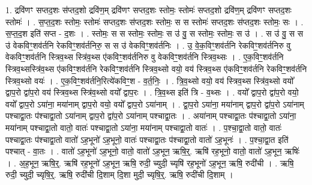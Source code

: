 \documentclass[17pt]{extarticle}
\begin{document}
1. द्रवि॑णꣳ सप्तद॒शः स॑प्तद॒शो द्रवि॑ण॒म् द्रवि॑णꣳ सप्तद॒शः स्तोमः॒ स्तोमः॑ सप्तद॒शो द्रवि॑ण॒म् द्रवि॑णꣳ सप्तद॒शः स्तोमः॑ । . स॒प्त॒द॒शः स्तोमः॒ स्तोमः॑ सप्तद॒शः स॑प्तद॒शः स्तोमः॒ स स स्तोमः॑ सप्तद॒शः स॑प्तद॒शः स्तोमः॒ सः । . स॒प्त॒द॒श इति॑ सप्त - द॒शः । . स्तोमः॒ स स स्तोमः॒ स्तोमः॒ स उ॑ वु॒ स स्तोमः॒ स्तोमः॒ स उ॑ । . स उ॑ वु॒ स स उ॑ वेकविꣳ॒॒शव॑र्तनि रेकविꣳ॒॒शव॑र्तनिरु॒ स स उ॑ वेकविꣳ॒॒शव॑र्तनिः । . उ॒ वे॒क॒विꣳ॒॒शव॑र्तनि रेकविꣳ॒॒शव॑र्तनिरु वु वेकविꣳ॒॒शव॑र्तनि स्त्रिव॒थ्स स्त्रि॑व॒थ्स ए॑कविꣳ॒॒शव॑र्तनिरु वु वेकविꣳ॒॒शव॑र्तनि स्त्रिव॒थ्सः । . ए॒क॒विꣳ॒॒शव॑र्तनि स्त्रिव॒थ्सस्त्रि॑व॒थ्स ए॑कविꣳ॒॒शव॑र्तनि रेकविꣳ॒॒शव॑र्तनि स्त्रिव॒थ्सो वयो॒ वय॑ स्त्रिव॒थ्स ए॑कविꣳ॒॒शव॑र्तनि रेकविꣳ॒॒शव॑र्तनि स्त्रिव॒थ्सो वयः॑ । . ए॒क॒विꣳ॒॒शव॑र्तनि॒रित्ये॑कविꣳ॒॒श - व॒र्त॒निः॒ । . त्रि॒व॒थ्सो वयो॒ वय॑ स्त्रिव॒थ्स स्त्रि॑व॒थ्सो वयो᳚ द्वाप॒रो द्वा॑प॒रो वय॑ स्त्रिव॒थ्स स्त्रि॑व॒थ्सो वयो᳚ द्वाप॒रः । . त्रि॒व॒थ्स इति॑ त्रि - व॒थ्सः । . वयो᳚ द्वाप॒रो द्वा॑प॒रो वयो॒ वयो᳚ द्वाप॒रो ऽया॑ना॒ मया॑नाम् द्वाप॒रो वयो॒ वयो᳚ द्वाप॒रो ऽया॑नाम् । . द्वा॒प॒रो ऽया॑ना॒ मया॑नाम् द्वाप॒रो द्वा॑प॒रो ऽया॑नाम् पश्चाद्वा॒तः प॑श्चाद्वा॒तो ऽया॑नाम् द्वाप॒रो द्वा॑प॒रो ऽया॑नाम् पश्चाद्वा॒तः । . अया॑नाम् पश्चाद्वा॒तः प॑श्चाद्वा॒तो ऽया॑ना॒ मया॑नाम् पश्चाद्वा॒तो वातो॒ वातः॑ पश्चाद्वा॒तो ऽया॑ना॒ मया॑नाम् पश्चाद्वा॒तो वातः॑ । . प॒श्चा॒द्वा॒तो वातो॒ वातः॑ पश्चाद्वा॒तः प॑श्चाद्वा॒तो वातो॑ ऽह॒भूनो॑ ऽह॒भूनो॒ वातः॑ पश्चाद्वा॒तः प॑श्चाद्वा॒तो वातो॑ ऽह॒भूनः॑ । . प॒श्चा॒द्वा॒त इति॑ पश्चात् - वा॒तः । . वातो॑ ऽह॒भूनो॑ ऽह॒भूनो॒ वातो॒ वातो॑ ऽह॒भून॒ ऋषि॒र्॒. ऋषि॑ रह॒भूनो॒ वातो॒ वातो॑ ऽह॒भून॒ ऋषिः॑ । . अ॒ह॒भून॒ ऋषि॒र्॒. ऋषि॑ रह॒भूनो॑ ऽह॒भून॒ ऋषि॒ रुदी॒ च्युदी॒ च्यृषि॑ रह॒भूनो॑ ऽह॒भून॒ ऋषि॒ रुदी॑ची । . ऋषि॒ रुदी॒ च्युदी॒ च्यृषि॒र्॒. ऋषि॒ रुदी॑ची दि॒शाम् दि॒शा मुदी॒ च्यृषि॒र्॒. ऋषि॒ रुदी॑ची दि॒शाम् । \newline
\end{document}
